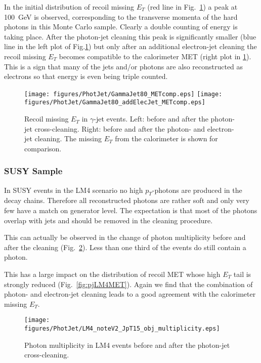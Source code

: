 \documentclass{cmspaper}
\begin{document}
In the initial distribution of recoil missing $E_T$ (red line in
Fig.~\ref{fig:pjMET}) a peak at 100\ GeV is observed, corresponding to the
transverse momenta of the hard photons in this Monte Carlo sample. Clearly a
double counting of energy is taking place.  After the photon-jet cleaning this
peak is significantly smaller (blue line in the left plot of
Fig.\ref{fig:pjMET}) but only after an additional electron-jet cleaning the
recoil missing $E_T$ becomes compatible to the calorimeter MET (right plot in
\ref{fig:pjMET}). This is a sign that many of the jets and/or photons are also
reconstructed as electrons so that energy is even being triple counted.
\begin{figure}[hbtp]
  \begin{center}
    \texttt{[image: figures/PhotJet/GammaJet80\_METcomp.eps]}
    \texttt{[image: figures/PhotJet/GammaJet80\_addElecJet\_METcomp.eps]}
    \caption{Recoil missing $E_T$ in $\gamma$-jet events. Left: before and
    after the photon-jet cross-cleaning. Right: before and after the photon-
    and electron-jet cleaning. The missing $E_T$ from the calorimeter is shown
    for comparison.}
    \label{fig:pjMET}
  \end{center}
\end{figure}

\clearpage
\subsubsection{SUSY Sample}
In SUSY events in the LM4 scenario no high $p_T$-photons are produced in the
decay chains. Therefore all reconstructed photons are rather soft and only very
few have a match on generator level. The expectation is that most of the
photons overlap with jets and should be removed in the cleaning procedure.

This can actually be observed in the change of photon multiplicity before and
after the cleaning (Fig.~\ref{fig:pjLM4mult}). Less than one third of the
events do still contain a photon.

This has a large impact on the distribution of recoil MET whose high $E_T$ tail
is strongly reduced (Fig.~\ref{fig:pjLM4MET}). Again we find that the
combination of photon- and electron-jet cleaning leads to a good agreement with
the calorimeter missing $E_T$.

\begin{figure}[hbtp]
  \begin{center}
      \texttt{[image: figures/PhotJet/LM4\_noteV2\_JpT15\_obj\_multiplicity.eps]}
    \caption{Photon multiplicity in LM4 events before and after the photon-jet
    cross-cleaning.}
    \label{fig:pjLM4mult}
  \end{center}
\end{figure}
\end{document}
